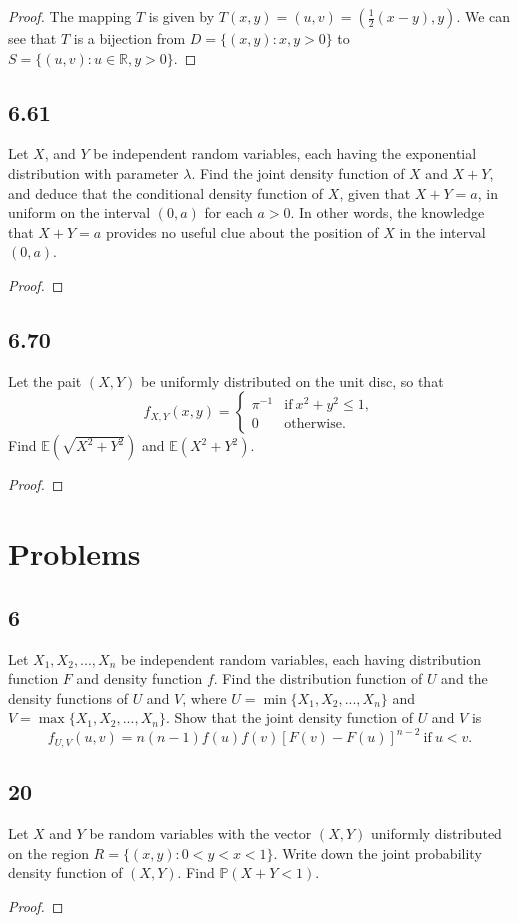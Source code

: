 \documentclass{article}
\newcommand{\R}{\mathbb{R}}
\renewcommand{\P}[1]{\mathbb{P}(#1)}
\newcommand{\E}[1]{\mathbb{E}(#1)}
\begin{document}
\begin{proof}
    The mapping $T$ is given by $T(x,y) = (u,v) = (\frac{1}{2}(x-y), y)$. We can
    see that $T$ is a bijection from $D=\{(x,y): x,y > 0\}$ to
    ${S = \{(u,v): u \in \R, y>0\}}$.
\end{proof}

\subsection*{6.61}
Let $X$, and $Y$ be independent random variables, each having the exponential
distribution with parameter $\lambda$. Find the joint density function of
$X$ and $X+Y$, and deduce that the conditional density function of $X$,
given that $X+Y=a$, in uniform on the interval $(0,a)$ for each $a>0$.
In other words, the knowledge that $X+Y = a$ provides no useful clue
about the position of $X$ in the interval $(0,a)$.

\begin{proof}

\end{proof}

\subsection*{6.70}
Let the pait $(X,Y)$ be uniformly distributed on the unit disc, so that
\begin{equation*}
    f_{X,Y}(x,y) = \begin{cases}
        \pi^{-1} & \text{if} \ x^2 + y^2 \leq 1, \\
        0        & \text{otherwise}.
    \end{cases}
\end{equation*}
Find $\E{\sqrt{X^2 + Y^2}}$ and $\E{X^2 + Y^2}$.

\begin{proof}

\end{proof}

\section*{Problems}
\subsection*{6}
Let $X_1, X_2,...,X_n$ be independent random variables, each having
distribution function $F$ and density function $f$. Find the distribution
function of $U$ and the density functions of $U$ and $V$, where
$U = \min\{X_1,X_2,...,X_n\}$ and $V = \max\{X_1, X_2,...,X_n\}$.
Show that the joint density function of $U$ and $V$ is
\begin{equation*}
    f_{U,V}(u,v) = n(n-1)f(u)f(v)[F(v)-F(u)]^{n-2} \ \text{if} \ u < v.
\end{equation*}

\subsection*{20}
Let $X$ and $Y$ be random variables with the vector $(X,Y)$ uniformly
distributed on the region $R= \{(x,y): 0<y<x<1\}$. Write down the joint
probability density function of $(X,Y)$. Find $\P{X+Y < 1}$.

\begin{proof}

\end{proof}
\end{document}
